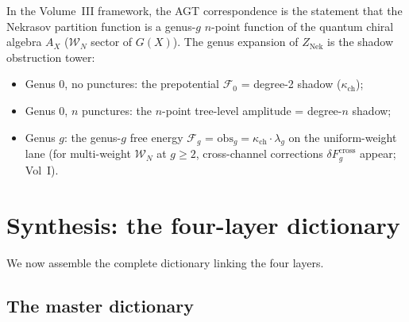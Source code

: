 \documentclass[11pt]{article}
\theoremstyle{definition}
\theoremstyle{remark}
\newcommand{\cF}{\mathcal{F}}
\newcommand{\cW}{\mathcal{W}}
\newcommand{\Nek}{\mathrm{Nek}}
\begin{document}
In the Volume~III framework, the AGT correspondence is the statement that the Nekrasov
partition function is a genus-$g$ $n$-point function of the quantum chiral algebra $A_X$
($\cW_N$ sector of $G(X)$). The genus expansion of $Z_{\Nek}$ is the shadow obstruction tower:
\begin{itemize}[nosep]
 \item Genus 0, no punctures: the prepotential $\cF_0$ = degree-2 shadow ($\kappa_{\mathrm{ch}}$);
 \item Genus 0, $n$ punctures: the $n$-point tree-level amplitude = degree-$n$ shadow;
 \item Genus $g$: the genus-$g$ free energy $\cF_g$ = $\mathrm{obs}_g = \kappa_{\mathrm{ch}} \cdot \lambda_g$ on the uniform-weight lane (for multi-weight $\cW_N$ at $g \geq 2$, cross-channel corrections $\delta F_g^{\mathrm{cross}}$ appear; Vol~I).
\end{itemize}


\section{Synthesis: the four-layer dictionary}
\label{sec:synthesis}

We now assemble the complete dictionary linking the four layers.

\subsection{The master dictionary}
\label{subsec:master-dictionary}
\end{document}
